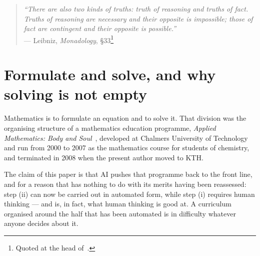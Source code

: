 \documentclass[11pt]{article}
\begin{document}
\begin{abstract}
What remains for people is step (i), together with what is needed to judge the output of step (ii):
formulating the model, controlling the error, and deciding whether a computed quantity carries
information. That is a different curriculum, and it is not a curriculum that has to be invented. It
has been written and published over three decades as \emph{Applied Mathematics: Body and Soul} at
university level and as \emph{Leibniz World of Math} at school level: every subject presented in
both its analytical and its computational form, the derivative as a difference quotient that is
actually computed, the integral as a time-stepping algorithm that is actually run, and programming as
the notation in which mathematics is written rather than as a subject beside it. We set out what
changes at each level, and we state the objections, including the one that this programme made the
same proposal before AI existed and did not win the argument.
\end{abstract}

\begin{quote}
\small\emph{``There are also two kinds of truths: truth of reasoning and truths of fact. Truths of
reasoning are necessary and their opposite is impossible; those of fact are contingent and their
opposite is possible.''}\\[0.2em]
\hfill --- Leibniz, \emph{Monadology}, \S33\footnote{Quoted at the head of~\cite{leibnizworld}.}
\end{quote}

\section{Formulate and solve, and why solving is not empty}\label{sec:empty}

Mathematics is to formulate an equation and to solve it. That division was the organising structure
of a mathematics education programme, \emph{Applied Mathematics: Body and
Soul}~\cite{bodysoul,bsbooks}, developed at Chalmers University of Technology and run from 2000 to
2007 as the mathematics course for students of chemistry, and terminated in 2008 when the present
author moved to KTH.

The claim of this paper is that AI pushes that programme back to the front line, and for a reason
that has nothing to do with its merits having been reassessed: step (ii) can now be carried out in
automated form, while step (i) requires human thinking --- and is, in fact, what human thinking is
good at. A curriculum organised around the half that has been automated is in difficulty whatever
anyone decides about it.
\end{document}
